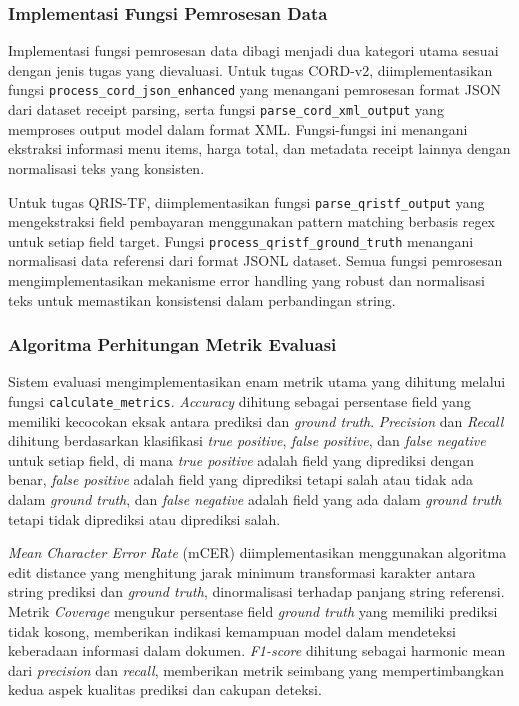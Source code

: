 \subsubsection{Implementasi Fungsi Pemrosesan Data}

Implementasi fungsi pemrosesan data dibagi menjadi dua kategori utama sesuai dengan jenis tugas yang dievaluasi. Untuk tugas CORD-v2, diimplementasikan fungsi \texttt{process\_cord\_json\_enhanced} yang menangani pemrosesan format JSON dari dataset receipt parsing, serta fungsi \texttt{parse\_cord\_xml\_output} yang memproses output model dalam format XML. Fungsi-fungsi ini menangani ekstraksi informasi menu items, harga total, dan metadata receipt lainnya dengan normalisasi teks yang konsisten.

Untuk tugas QRIS-TF, diimplementasikan fungsi \texttt{parse\_qristf\_output} yang mengekstraksi field pembayaran menggunakan pattern matching berbasis regex untuk setiap field target. Fungsi \texttt{process\_qristf\_ground\_truth} menangani normalisasi data referensi dari format JSONL dataset. Semua fungsi pemrosesan mengimplementasikan mekanisme error handling yang robust dan normalisasi teks untuk memastikan konsistensi dalam perbandingan string.

\subsubsection{Algoritma Perhitungan Metrik Evaluasi}

Sistem evaluasi mengimplementasikan enam metrik utama yang dihitung melalui fungsi \texttt{calculate\_metrics}. \textit{Accuracy} dihitung sebagai persentase field yang memiliki kecocokan eksak antara prediksi dan \textit{ground truth}. \textit{Precision} dan \textit{Recall} dihitung berdasarkan klasifikasi \textit{true positive}, \textit{false positive}, dan \textit{false negative} untuk setiap field, di mana \textit{true positive} adalah field yang diprediksi dengan benar, \textit{false positive} adalah field yang diprediksi tetapi salah atau tidak ada dalam \textit{ground truth}, dan \textit{false negative} adalah field yang ada dalam \textit{ground truth} tetapi tidak diprediksi atau diprediksi salah.

\textit{Mean Character Error Rate} (mCER) diimplementasikan menggunakan algoritma edit distance yang menghitung jarak minimum transformasi karakter antara string prediksi dan \textit{ground truth}, dinormalisasi terhadap panjang string referensi. Metrik \textit{Coverage} mengukur persentase field \textit{ground truth} yang memiliki prediksi tidak kosong, memberikan indikasi kemampuan model dalam mendeteksi keberadaan informasi dalam dokumen. \textit{F1-score} dihitung sebagai harmonic mean dari \textit{precision} dan \textit{recall}, memberikan metrik seimbang yang mempertimbangkan kedua aspek kualitas prediksi dan cakupan deteksi.

